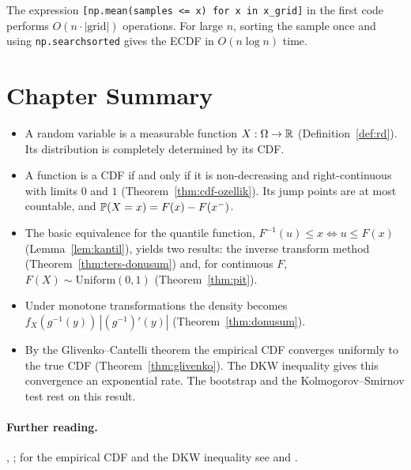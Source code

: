 \documentclass[main.tex]{subfiles}
\begin{document}
\begin{remark}
The expression \texttt{[np.mean(samples <= x) for x in x\_grid]} in the first code performs $O(n\cdot|\text{grid}|)$ operations. For large $n$, sorting the sample once and using \texttt{np.searchsorted} gives the ECDF in $O(n\log n)$ time.
\end{remark}

\section{Chapter Summary}
\begin{summary}
\begin{itemize}
  \item A random variable is a measurable function $X:\Omega\to\R$ (Definition~\ref{def:rd}). Its distribution is completely determined by its CDF.
  \item A function is a CDF if and only if it is non-decreasing and right-continuous with limits $0$ and $1$ (Theorem~\ref{thm:cdf-ozellik}). Its jump points are at most countable, and $\P(X=x)=F(x)-F(x^-)$.
  \item The basic equivalence for the quantile function, $F^{-1}(u)\le x\iff u\le F(x)$ (Lemma~\ref{lem:kantil}), yields two results: the inverse transform method (Theorem~\ref{thm:ters-donusum}) and, for continuous $F$, $F(X)\sim\text{Uniform}(0,1)$ (Theorem~\ref{thm:pit}).
  \item Under monotone transformations the density becomes $f_X(g^{-1}(y))\,|(g^{-1})'(y)|$ (Theorem~\ref{thm:donusum}).
  \item By the Glivenko--Cantelli theorem the empirical CDF converges uniformly to the true CDF (Theorem~\ref{thm:glivenko}). The DKW inequality gives this convergence an exponential rate. The bootstrap and the Kolmogorov--Smirnov test rest on this result.
\end{itemize}
\end{summary}

\paragraph{Further reading.} \cite[Chapters~1--2]{casella}, \cite[Chapter~2]{wasserman}; for the empirical CDF and the DKW inequality see \cite[Chapter~7]{wasserman} and \cite[Chapter~19]{vdv}.
\end{document}
